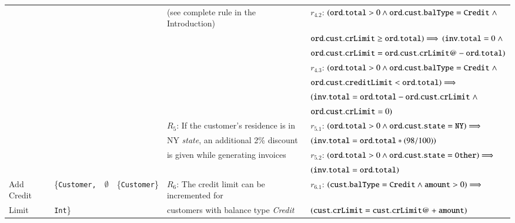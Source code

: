 \begin{table*}[t]
{\begin{tabular}{|l|l|l|l|l|l|}
& & & & (see complete rule in the Introduction) &
$r_{4.2}$: $({\tt ord.total} > 0 \wedge {\tt ord.cust.balType} = {\tt Credit} \; \wedge$ \\
& & & & &
\hspace*{10pt}${\tt ord.cust.crLimit} \geq {\tt ord.total}) \Longrightarrow$ $({\tt inv.total} = 0 \; \wedge$\\
& & & & &
\hspace*{10pt}${\tt ord.cust.crLimit} = {\tt ord.cust.crLimit@} - {\tt ord.total})$ \\
& & & & &
$r_{4.3}$: $({\tt ord.total} > 0 \wedge {\tt ord.cust.balType} = {\tt Credit} \; \wedge$ \\
& & & & &
\hspace*{10pt}${\tt ord.cust.creditLimit} < {\tt ord.total}) \Longrightarrow$ \\
& & & & &
\hspace*{10pt}$({\tt inv.total} = {\tt ord.total} - {\tt ord.cust.crLimit} \; \wedge$ \\
& & & & &
\hspace*{10pt}${\tt ord.cust.crLimit} = 0)$ \\
\cline{5-6}
& & & & $R_5$: If the customer's residence is in &
$r_{5.1}$: $({\tt ord.total} > 0 \wedge {\tt ord.cust.state} = {\tt NY})
\Longrightarrow$ \\ 
& & & & NY \textit{state}, an additional 2\% discount &
\hspace*{10pt}$({\tt inv.total} = {\tt ord.total} * (98 / 100))$ \\ 
& & & & is given while generating invoices &
$r_{5.2}$: $({\tt ord.total} > 0 \wedge {\tt ord.cust.state} = {\tt Other})
\Longrightarrow$ \\
& & & & &
\hspace*{10pt}$({\tt inv.total} = {\tt ord.total})$ \\
\hline
Add Credit & \{{\tt Customer,} & \multicolumn{1}{|c|}{$\emptyset$} &
\{{\tt Customer}\} &
$R_6$: The credit limit can be incremented for &
$r_{6.1}$: $({\tt cust.balType} = {\tt Credit} \wedge {\tt amount} > 0) \Longrightarrow$ \\
Limit & {\tt Int}\} & & & customers with balance type \textit{Credit} &
\hspace*{10pt}$({\tt cust.crLimit} = {\tt cust.crLimit@} + {\tt amount})$\\
\hline

\end{tabular}}
\end{table*}
